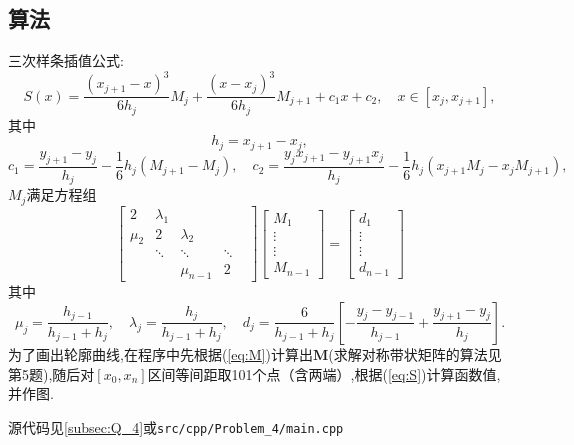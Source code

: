 \documentclass[UTF-8]{article}
\begin{document}
\subsection{算法}
三次样条插值公式:
\begin{equation} 
S(x)=\frac{\left(x_{j+1}-x\right)^{3}}{6 h_{j}} M_{j}+\frac{\left(x-x_{j}\right)^{3}}{6 h_{j}} M_{j+1}+c_{1} x+c_{2},\quad x\in [x_j, x_{j+1}],
\label{eq:S}
\end{equation}
其中
\begin{equation}
h_{j}=x_{j+1}-x_j,
\end{equation}
\begin{equation} 
c_{1}=\frac{y_{j+1}-y_{j}}{h_{j}}-\frac{1}{6} h_{j}\left(M_{j+1}-M_{j}\right),\quad c_{2}=\frac{y_{j} x_{j+1}-y_{j+1} x_{j}}{h_{j}}-\frac{1}{6} h_{j}\left(x_{j+1} M_{j}-x_{j} M_{j+1}\right),
\end{equation}
$M_{j}$满足方程组
\begin{equation}
\begin{bmatrix}
2 & \lambda_1 & & & \\
\mu_2 & 2 & \lambda_2 & & \\
& \ddots & \ddots & \ddots & \\
& & \mu_{n-1} & 2
\end{bmatrix}
\begin{bmatrix}
M_1\\
\vdots\\
\vdots\\
M_{n-1}
\end{bmatrix}
=
\begin{bmatrix}
d_1\\
\vdots\\
\vdots\\
d_{n-1}
\end{bmatrix}
\label{eq:M}
\end{equation}
其中
\begin{equation} 
\mu_{j}=\frac{h_{j-1}}{h_{j-1}+h_{j}}, \quad \lambda_{j}=\frac{h_{j}}{h_{j-1}+h_{j}},\quad d_{j}=\frac{6}{h_{j-1}+h_{j}}\left[-\frac{y_{j}-y_{j-1}}{h_{j-1}}+\frac{y_{j+1}-y_{j}}{h_{j}}\right].
\end{equation}
为了画出轮廓曲线,在程序中先根据(\ref{eq:M})计算出$\bm{M}$(求解对称带状矩阵的算法见第5题),随后对$[x_0, x_n]$区间等间距取101个点（含两端）,根据(\ref{eq:S})计算函数值,并作图.

源代码见\ref{subsec:Q_4}或\texttt{src/cpp/Problem\_4/main.cpp}
\end{document}
